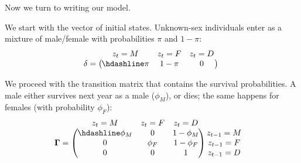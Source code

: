\documentclass[
  12pt,
]{krantz}
\begin{document}
Now we turn to writing our model.

We start with the vector of initial states. Unknown-sex individuals enter as a mixture of male/female with probabilities \(\pi\) and \(1-\pi\):
\[\begin{matrix}
& \\
\mathbf{\delta} =
  \left ( \vphantom{ \begin{matrix} 12 \end{matrix} } \right .
          \end{matrix}
          \hspace{-1.2em}
          \begin{matrix}
          z_t=M & z_t=F & z_t=D \\ \hdashline
          \pi & 1 - \pi & 0\\
          \end{matrix}
          \hspace{-0.2em}
          \begin{matrix}
          & \\
          \left . \vphantom{ \begin{matrix} 12 \end{matrix} } \right )
\begin{matrix}
\end{matrix}
\end{matrix}\]

We proceed with the transition matrix that contains the survival probabilities. A male either survives next year as a male (\(\phi_M\)), or dies; the same happens for females (with probability \(\phi_F\)):
\[\begin{matrix}
& \\
\mathbf{\Gamma} =
  \left ( \vphantom{ \begin{matrix} 12 \\ 12 \\ 12 \end{matrix} } \right .
          \end{matrix}
          \hspace{-1.2em}
          \begin{matrix}
          z_t=M & z_t=F & z_t=D \\ \hdashline
          \phi_M  & 0 & 1 - \phi_M\\
          0 & \phi_F & 1 - \phi_F\\
          0 & 0 & 1
          \end{matrix}
          \hspace{-0.2em}
          \begin{matrix}
          & \\
          \left . \vphantom{ \begin{matrix} 12 \\ 12 \\ 12 \end{matrix} } \right )
\begin{matrix}
z_{t-1}=M \\ z_{t-1}=F \\ z_{t-1}=D
\end{matrix}
\end{matrix}\]
\end{document}
